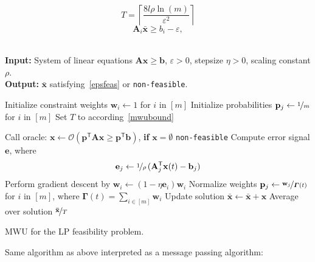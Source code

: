 \documentclass[6pt, DIV=12]{scrartcl}
\theoremstyle{definition}
\newcommand{\cO}{\ensuremath{{\mathcal O}}\xspace}
\newcommand{\trans}{^\mathsf{T}}
\renewcommand{\vec}[1]{\mathbf{#1}}
\begin{document}
 
\begin{equation}\label{mwubound}
T = \left\lceil \frac{8 l \rho \ln(m)}{\varepsilon^2} \right\rceil 
\end{equation}
\begin{equation}\label{epsfeas}
\vec{A}_i \vec{\bar{x}} \geq b_i - \varepsilon,
\end{equation}

\begin{algorithm}[H]\mbox{\hfill}
\\\textbf{Input:} System of linear equations $\vec{A} \vec{x} \geq \vec{b}$, $\varepsilon > 0$,  stepsize $\eta > 0$, scaling constant $\rho$. \\
\textbf{Output:} $\vec{\bar{x}}$ satisfying~\cref{epsfeas} or \texttt{non-feasible}.
\begin{algorithmic}[1]
	\State Initialize constraint weights $\vec{w}_i \leftarrow 1$ for $i$ in $[m]$ 
	\State Initialize probabilities $\vec{p}_j \leftarrow \nicefrac{1}{m}$ for $i$ in $[m]$ 
	\State Set $T$ to according~\cref{mwubound}

	\State Call oracle: $\vec{x} \leftarrow \cO(\vec{p}\trans \vec{A} \vec{x} \geq \vec{p}\trans \vec{b})$, \textbf{if} $
	\vec{x} = \emptyset$ \Return  \texttt{non-feasible}
	\State Compute error signal $\vec{e}$, where
	\begin{equation*}
		\vec{e}_j \leftarrow \nicefrac{1}{\rho}\,(\vec{A}_j\trans \vec{x}(t) - \vec{b}_j)   
	\end{equation*}
	\State Perform gradient descent by $\vec{w}_i \leftarrow (1 - \eta \vec{e}_i) \vec{w}_i$ 
	\State Normalize weights $\vec{p}_j \leftarrow \nicefrac{\vec{w}_j}{\boldsymbol{\Gamma}(t)} $  for $i$ in $[m]$, where $\boldsymbol{\Gamma}(t) = \sum_{i \in [m]} \vec{w}_i$
	\State Update solution $\vec{\bar{x}} \leftarrow \vec{\bar{x}} + \vec{x}$
	\EndFor
	\State \Return Average over solution $ \nicefrac{\vec{\bar{x}}}{T} $
\end{algorithmic}
\caption{MWU for the LP feasibility problem.}
\label{alg:as}
\end{algorithm}
Same algorithm as above interpreted as a message passing algorithm:
\end{document}
